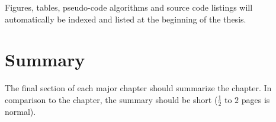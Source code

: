 Figures, tables, pseudo-code algorithms and source code listings will automatically be indexed and listed at the beginning of the thesis.


\section{Summary}
\label{s:Contribution-1-Summary}

The final section of each major chapter should summarize the chapter. In comparison to the chapter, the summary should be short ($\frac{1}{2}$ to $2$ pages is normal).